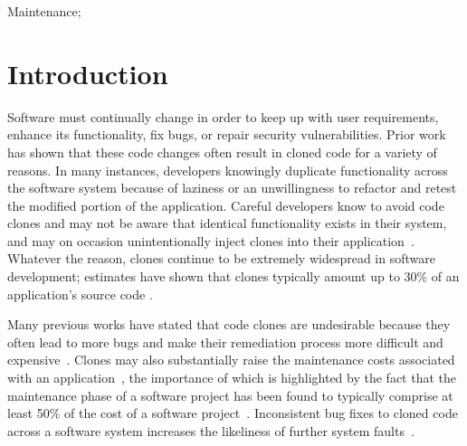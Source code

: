\documentclass{sig-alternate}
\begin{document}
Maintenance;









\section{Introduction}
Software must continually change in order to keep up with user requirements, enhance its functionality, fix bugs, or repair security vulnerabilities. Prior work has shown that these code changes often result in cloned code for a variety of reasons. In many instances, developers knowingly duplicate functionality across the software system because of laziness or an unwillingness to refactor and retest the modified portion of the application. Careful developers know to avoid code clones and may not be aware that identical functionality exists in their system, and may on occasion unintentionally inject clones into their application~\cite{Duala-Ekoko:2010:CRD:1767751.1767754,Baker:1995:FDN:832303.836911}. Whatever the reason, clones continue to be extremely widespread in software development; estimates have shown that clones typically amount up to 30\% of an application's source code \cite{Baxter:1998:CDU:850947.853341,Kim:2005:ESC:1095430.1081737}.

Many previous works have stated that code clones are undesirable because they often lead to more bugs and make their remediation process more difficult and expensive~\cite{Duala-Ekoko:2010:CRD:1767751.1767754,Baker:1995:FDN:832303.836911,Baxter:1998:CDU:850947.853341}. Clones may also substantially raise the maintenance costs associated with an application~\cite{Juergens:2009:CCM:1555001.1555062}, the importance of which is highlighted by the fact that the maintenance phase of a software project has been found to typically comprise at least 50\% of the cost of a software project~\cite{SMR:SMR225}. Inconsistent bug fixes to cloned code across a software system increases the likeliness of further system faults~\cite{Deissenboeck_2010}.
\end{document}
